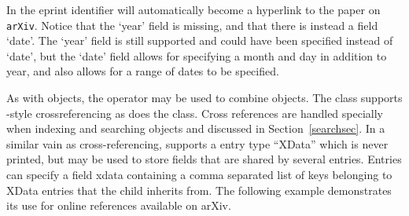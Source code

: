 \documentclass[article]{jss}\usepackage[]{graphicx}\usepackage[]{color}
\begin{document}
In \Biblatex{} the eprint identifier will automatically become a hyperlink to the paper on \texttt{arXiv}.  Notice that the `year' field is missing, and that there is instead a field `date'.  The `year' field is still supported and could have been specified instead of `date', but the `date' field allows for specifying a month and day in addition to year, and also allows for a range of dates to be specified.

As with  objects, the operator  may be used to combine  objects.  The  class supports \Bibtex{}-style crossreferencing as does the  class.  Cross references are handled specially when indexing and searching  objects and discussed in Section~\ref{searchsec}.  In a similar vain as cross-referencing, \Biblatex{} supports a entry type ``XData'' which is never printed, but may be used to store fields that are shared by several entries.  Entries can specify a field xdata containing a comma separated list of keys belonging to XData entries that the child inherits from.  The following example demonstrates its use for online references available on arXiv.
\end{document}
